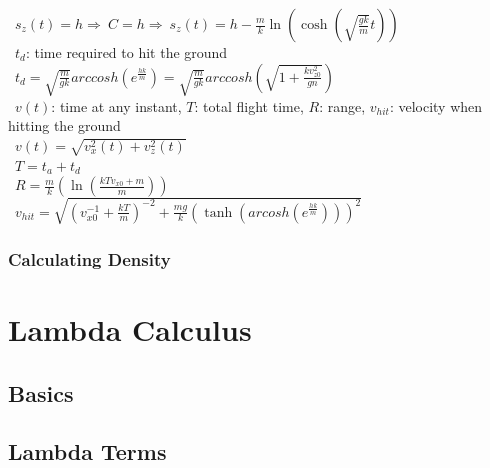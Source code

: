 \documentclass[10pt,letterpaper]{scrartcl}
\newcommand{\tbul}{\textbullet}
\newcommand{\tend}{\>\textendash}
\begin{document}
\begin{tabbing}
\>\>\ $\displaystyle s_z(t) = h\Rightarrow\ C = h\Rightarrow\ s_z(t) = h-\frac{m}{k}\ln(\cosh(\sqrt{\frac{gk}{m}}t))$ \\
\tend\ $t_d$: time required to hit the ground \\
\>\>\ $\displaystyle t_d = \sqrt{\frac{m}{gk}}arccosh(e^{\frac{hk}{m}}) = \sqrt{\frac{m}{gk}}arccosh(\sqrt{1 + \frac{kv^2_{z0}}{gn}})$ \\
\tbul\ $v(t)$: time at any instant, $T$: total flight time, $R$: range, $v_{hit}$: velocity when hitting the ground \\
\>\>\ $\displaystyle v(t) = \sqrt{v^2_x(t) + v^2_z(t)}$ \\
\>\>\ $\displaystyle T = t_a + t_d$ \\
\>\>\ $\displaystyle R = \frac{m}{k}(\ln(\frac{kTv_{x0}+m}{m}))$ \\
\>\>\ $\displaystyle v_{hit} = \sqrt{(v^{-1}_{x0} + \frac{kT}{m})^{-2} + \frac{mg}{k}(\tanh(arcosh(e^{\frac{hk}{m}})))^2}$ \\
\end{tabbing}
\subsubsection*{Calculating Density}

\newpage\section{Lambda Calculus}
\subsection*{Basics}

\subsection*{Lambda Terms}
\end{document}
